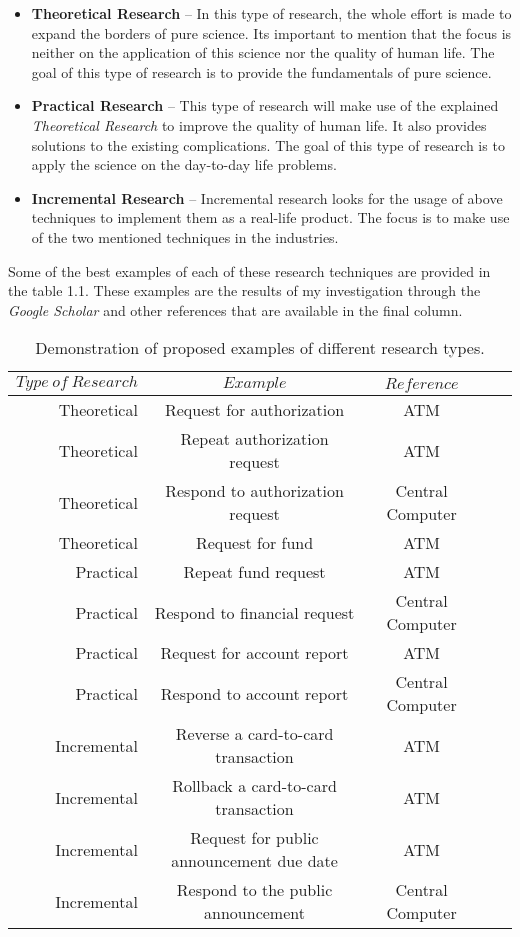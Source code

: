 \documentclass[12pt]{article}
\numberwithin{equation}{section}
\numberwithin{table}{section}
\numberwithin{figure}{section}
\begin{document}
\begin{itemize}
	\item{\textbf{Theoretical Research}} -- In this type of research, the whole effort is made to expand the borders of pure science. Its important to mention that the focus is neither on the application of this science nor the quality of human life. The goal of this type of research is to provide the fundamentals of pure science.
	\item{\textbf{Practical Research}} -- This type of research will make use of the explained \textit{Theoretical Research} to improve the quality of human life. It also provides solutions to the existing complications. The goal of this type of research is to apply the science on the day-to-day life problems.
	\item{\textbf{Incremental Research}} -- Incremental research looks for the usage of above techniques to implement them as a real-life product. The focus is to make use of the two mentioned techniques in the industries.
\end{itemize}

Some of the best examples of each of these research techniques are provided in the table 1.1. These examples are the results of my investigation through the \textit{Google Scholar} and other references that are available in the final column.

\begin{table} \centering
	\begin{tabular}{rcccc}
		\hline
		$ Type \ of \ Research $ &
		$ Example $ & $ Reference $ \\
		\hline
		Theoretical & Request for authorization & ATM \\
		Theoretical & Repeat authorization request & ATM\\
		Theoretical & Respond to authorization request & Central Computer\\
		Theoretical & Request for fund & ATM \\
		Practical & Repeat fund request & ATM \\
		Practical & Respond to financial request & Central Computer \\
		Practical & Request for account report & ATM \\
		Practical & Respond to account report & Central Computer \\
		Incremental & Reverse a card-to-card transaction & ATM \\
		Incremental & Rollback a card-to-card transaction & ATM \\
		Incremental & Request for public announcement due date & ATM \\
		Incremental & Respond to the public announcement & Central Computer \\
				
		\hline
	\end{tabular}
	\caption{Demonstration of proposed examples of different research types.}
	\label{tabconvdemo}
\end{table}
\end{document}
